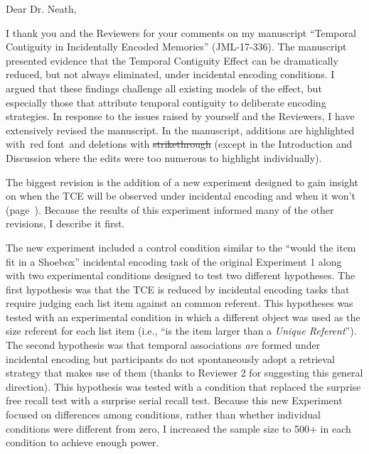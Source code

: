 \documentclass[12pt]{article}
\begin{document}
Dear Dr. Neath,

I thank you and the Reviewers for your comments on my manuscript ``Temporal Contiguity in Incidentally Encoded Memories'' (JML-17-336). The manuscript presented evidence that the Temporal Contiguity Effect can be dramatically reduced, but not always eliminated, under incidental encoding conditions. I argued that these findings challenge all existing models of the effect, but especially those that attribute temporal contiguity to deliberate encoding strategies. In response to the issues raised by yourself and the Reviewers, I have extensively revised the manuscript. In the manuscript, additions are highlighted with~\color{red}red font\color{black}~and deletions with \st{strikethrough} (except in the Introduction and Discussion where the edits were too numerous to highlight individually).

The biggest revision is the addition of a new experiment designed to gain insight on when the TCE will be observed under incidental encoding and when it won't (page~\pageref{newexp}). Because the results of this experiment informed many of the other revisions, I describe it first.

The new experiment included a control condition similar to the ``would the item fit in a Shoebox'' incidental encoding task of the original Experiment 1 along with two experimental conditions designed to test two different hypotheses. The first hypothesis was that the TCE is reduced by incidental encoding tasks that require judging each list item against an common referent. This hypotheses was tested with an experimental condition in which a different object was used as the size referent for each list item (i.e., ``is the item larger than a \emph{Unique Referent}''). The second hypothesis was that temporal associations \emph{are} formed under incidental encoding but participants do not spontaneously adopt a retrieval strategy that makes use of them (thanks to Reviewer 2 for suggesting this general direction). This hypothesis was tested with a condition that replaced the surprise free recall test with a surprise serial recall test. Because this new Experiment focused on differences among conditions, rather than whether individual conditions were different from zero, I increased the sample size to 500+ in each condition to achieve enough power.
\end{document}
